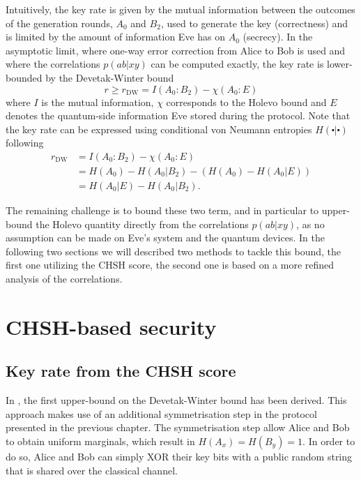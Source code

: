 Intuitively, the key rate is given by the mutual information between the outcomes of the generation rounds, $A_0$ and $B_2$, used to generate the key (correctness) and is limited by the amount of information Eve has on $A_0$ (secrecy).
In the asymptotic limit, where one-way error correction from Alice to Bob is used and where the correlations $p(ab|xy)$ can be computed exactly, the key rate is lower-bounded by the Devetak-Winter bound~\cite{Devetak2005}
\begin{equation}
	r \geq r_\mathrm{DW} = I(A_0 : B_2) - \chi(A_0 : E)
	\label{eq:Devetak-Winter}
\end{equation}
where $I$ is the mutual information, $\chi$ corresponds to the Holevo bound and $E$ denotes the quantum-side information Eve stored during the protocol.
Note that the key rate can be expressed using conditional von Neumann entropies $H(\centerdot|\centerdot)$ following
\begin{equation}
	\begin{split}
		r_\mathrm{DW} &= I(A_0 : B_2) - \chi(A_0 : E) \\
					  &= H(A_0)-H(A_0|B_2) - (H(A_0)- H(A_0|E)) \\
					  &= H(A_0|E) - H(A_0 | B_2).
	\end{split}
\end{equation}

The remaining challenge is to bound these two term, and in particular to upper-bound the Holevo quantity directly from the correlations $p(ab|xy)$, as no assumption can be made on Eve's system and the quantum devices. 
In the following two sections we will described two methods to tackle this bound, the first one utilizing the CHSH score, the second one is based on a more refined analysis of the correlations.

\section{CHSH-based security}

\subsection{Key rate from the CHSH score}
\label{sec:pironio}

In \cite{Pironio2009}, the first upper-bound on the Devetak-Winter bound has been derived.
This approach makes use of an additional symmetrisation step in the protocol presented in the previous chapter.
The symmetrisation step allow Alice and Bob to obtain uniform marginals, which result in $H(A_x)=H(B_y)=1$.
In order to do so, Alice and Bob can simply XOR their key bits with a public random string that is shared over the classical channel.

